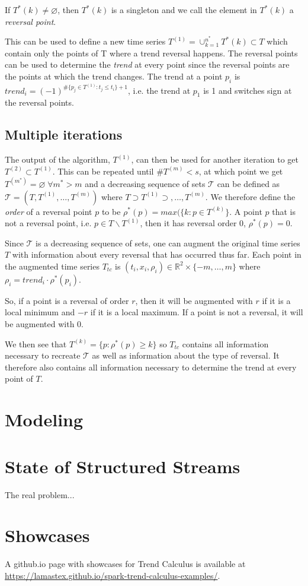 \documentclass[a4paper, 12pt]{article}
\begin{document}
If $T^*(k) \ne \varnothing$, then $T^*(k)$ is a singleton and we call the element in $T^*(k)$ a \textit{reversal point}.

This can be used to define a new time series $T^{(1)} = \cup_{k=1}^{n^*} T^*(k) \subset T$ which contain only the points of T where a trend reversal happens. The reversal points can be used to determine the \textit{trend} at every point since the reversal points are the points at which the trend changes. The trend at a point $p_i$ is $trend_i = (-1)^{\#\{p_j \in T^{(1)} : t_j \le t_i\} + 1}$, i.e. the trend at $p_1$ is 1 and switches sign at the reversal points.

\subsection{Multiple iterations}

The output of the algorithm, $T^{(1)}$, can then be used for another iteration to get $T^{(2)} \subset T^{(1)}$. This can be repeated until $\#T^{(m)} < s$, at which point we get $T^{(m^*)} = \varnothing \; \forall m^* > m$ and a decreasing sequence of sets $\mathcal{T}$ can be defined as $\mathcal{T} = (T, T^{(1)}, \dots, T^{(m)})$ where $T \supset T^{(1)} \supset, \dots, T^{(m)}$. We therefore define the \textit{order} of a reversal point $p$ to be $\rho^*(p) = max (\{ k : p \in T^{(k)} \}$. A point $p$ that is not a reversal point, i.e. $p \in T \backslash T^{(1)}$, then it has reversal order 0, $\rho^*(p) = 0$.

Since $\mathcal{T}$ is a decreasing sequence of sets, one can augment the original time series $T$ with information about every reversal that has occurred thus far. Each point in the augmented time series $T_{tc}$ is $(t_i,x_i,\rho_i) \in \mathbb{R}^2 \times \{ -m,\dots,m \}$ where $\rho_i = trend_i \cdot \rho^*(p_i)$.

So, if a point is a reversal of order $r$, then it will be augmented with $r$ if it is a local minimum and $-r$ if it is a local maximum. If a point is not a reversal, it will be augmented with $0$.

We then see that $T^{(k)} = \{ p : \rho^*(p) \ge k \} $ so $T_{tc}$ contains all information necessary to recreate $\mathcal{T}$ as well as information about the type of reversal. It therefore also contains all information necessary to determine the trend at every point of $T$.

\section{Modeling}



\section{State of Structured Streams}

The real problem...

\section{Showcases}

A github.io page with showcases for Trend Calculus is available at \url{https://lamastex.github.io/spark-trend-calculus-examples/}.
\end{document}
